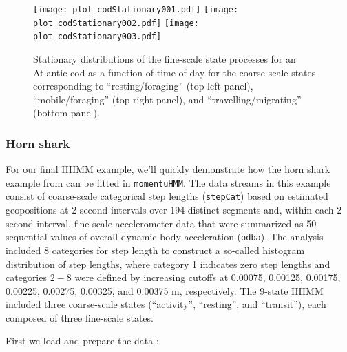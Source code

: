 \documentclass[12pt]{article}\usepackage[]{graphicx}\usepackage[]{xcolor}
\begin{document}
\begin{figure}[htbp]
  \centering
  \texttt{[image: plot\_codStationary001.pdf]}
  \texttt{[image: plot\_codStationary002.pdf]}
  \texttt{[image: plot\_codStationary003.pdf]}
  \caption{Stationary distributions of the fine-scale state processes for an Atlantic cod as a function of time of day for the coarse-scale states corresponding to ``resting/foraging'' (top-left panel), ``mobile/foraging'' (top-right panel), and ``travelling/migrating'' (bottom panel).}
  \label{fig:codStat}
\end{figure}

\subsubsection{Horn shark}
\label{sec:hornShark}
For our final HHMM example, we'll quickly demonstrate how the horn shark example from \cite{AdamEtAl2019} can be fitted in \verb|momentuHMM|. The data streams in this example consist of coarse-scale categorical step lengths (\verb|stepCat|) based on estimated geopositions at 2 second intervals over 194 distinct segments and, within each 2 second interval, fine-scale accelerometer data that were summarized as 50 sequential values of overall dynamic body acceleration (\verb|odba|). The analysis included 8 categories for step length to construct a so-called histogram distribution of step lengths, where category 1 indicates zero step lengths and categories $2-8$ were defined by increasing cutoffs at 0.00075, 0.00125, 0.00175, 0.00225, 0.00275, 0.00325, and 0.00375 m, respectively. The 9-state HHMM included three coarse-scale states (``activity'', ``resting'', and ``transit''), each composed of three fine-scale states.

First we load and prepare the data \citep[available for download from][]{AdamEtAl2019}:
\end{document}
